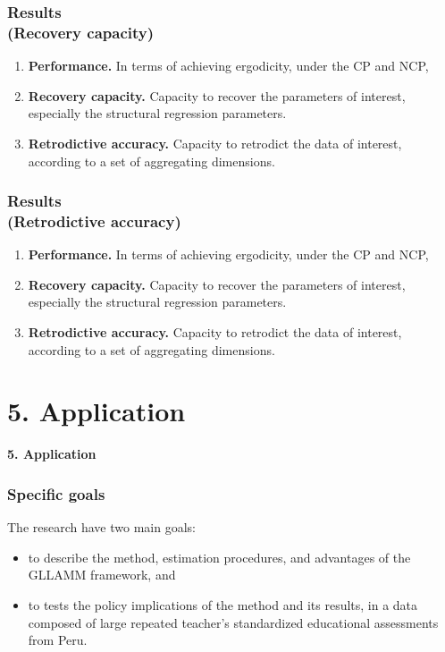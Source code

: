\documentclass[arial,12pt,xcolor=dvipsnames]{beamer}
\begin{document}
%
\begin{frame}
	\frametitle{Results \\
		(Recovery capacity)}
	\begin{enumerate}
		\item \textbf{Performance.} In terms of achieving ergodicity, under the CP and NCP, 
		\item \textbf{Recovery capacity.} Capacity to recover the parameters of interest, especially the structural regression parameters.
		\item \textbf{Retrodictive accuracy.} Capacity to retrodict the data of interest, according to a set of aggregating dimensions.
	\end{enumerate} 
\end{frame}
%
\begin{frame}
	\frametitle{Results \\
		(Retrodictive accuracy)}
	\begin{enumerate}
		\item \textbf{Performance.} In terms of achieving ergodicity, under the CP and NCP, 
		\item \textbf{Recovery capacity.} Capacity to recover the parameters of interest, especially the structural regression parameters.
		\item \textbf{Retrodictive accuracy.} Capacity to retrodict the data of interest, according to a set of aggregating dimensions.
	\end{enumerate} 
\end{frame}
%
%
\section{5. Application}
%
\begin{frame}
	\textbf{5. Application}
\end{frame}
%
\begin{frame}
	\frametitle{Specific goals}
	The research have two main goals:
	\begin{itemize}
		\item to describe the method, estimation procedures, and advantages of the GLLAMM framework, and 
		\item to tests the policy implications of the method and its results, in a data composed of large repeated teacher's standardized educational assessments from Peru. 
	\end{itemize}
\end{frame}
%
%
\end{document}
